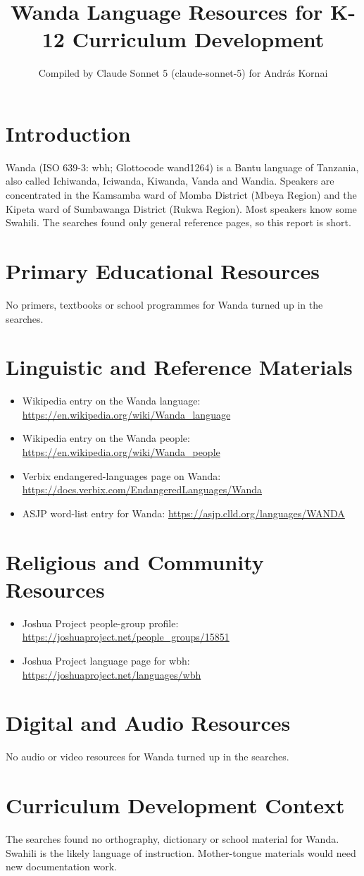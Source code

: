 \documentclass[12pt]{article}
\title{Wanda Language Resources for K-12 Curriculum Development}
\author{Compiled by Claude Sonnet 5 (claude-sonnet-5) for Andr\'as Kornai}
\date{}
\begin{document}
\maketitle

\section{Introduction}
Wanda (ISO 639-3: wbh; Glottocode wand1264) is a Bantu language of Tanzania, also called Ichiwanda, Iciwanda, Kiwanda, Vanda and Wandia. Speakers are concentrated in the Kamsamba ward of Momba District (Mbeya Region) and the Kipeta ward of Sumbawanga District (Rukwa Region). Most speakers know some Swahili. The searches found only general reference pages, so this report is short.

\section{Primary Educational Resources}
No primers, textbooks or school programmes for Wanda turned up in the searches.

\section{Linguistic and Reference Materials}
\begin{itemize}
\item Wikipedia entry on the Wanda language: \url{https://en.wikipedia.org/wiki/Wanda_language}
\item Wikipedia entry on the Wanda people: \url{https://en.wikipedia.org/wiki/Wanda_people}
\item Verbix endangered-languages page on Wanda: \url{https://docs.verbix.com/EndangeredLanguages/Wanda}
\item ASJP word-list entry for Wanda: \url{https://asjp.clld.org/languages/WANDA}
\end{itemize}

\section{Religious and Community Resources}
\begin{itemize}
\item Joshua Project people-group profile: \url{https://joshuaproject.net/people_groups/15851}
\item Joshua Project language page for wbh: \url{https://joshuaproject.net/languages/wbh}
\end{itemize}

\section{Digital and Audio Resources}
No audio or video resources for Wanda turned up in the searches.

\section{Curriculum Development Context}
The searches found no orthography, dictionary or school material for Wanda. Swahili is the likely language of instruction. Mother-tongue materials would need new documentation work.
\end{document}
